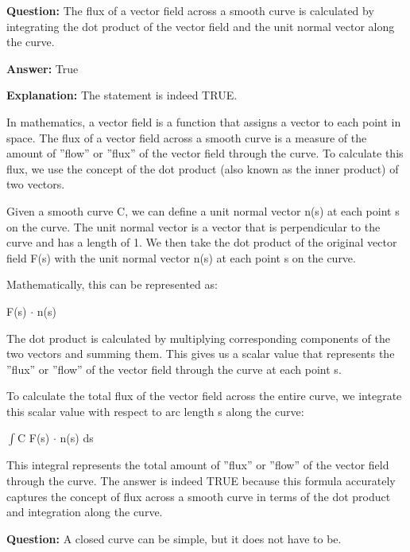 \documentclass{article}
\begin{document}
                \vspace{0.5cm} 
        
            
                \textbf {Question:} The flux of a vector field across a smooth curve is calculated by integrating the dot product of the vector field and the unit normal vector along the curve.
                
                \textbf{Answer:} True

                \textbf{Explanation:} The statement is indeed TRUE.

In mathematics, a vector field is a function that assigns a vector to each point in space. The flux of a vector field across a smooth curve is a measure of the amount of ''flow'' or ''flux'' of the vector field through the curve. To calculate this flux, we use the concept of the dot product (also known as the inner product) of two vectors.

Given a smooth curve C, we can define a unit normal vector n(s) at each point s on the curve. The unit normal vector is a vector that is perpendicular to the curve and has a length of 1. We then take the dot product of the original vector field F(s) with the unit normal vector n(s) at each point s on the curve.

Mathematically, this can be represented as:

F(s) \ensuremath{\cdot} n(s)

The dot product is calculated by multiplying corresponding components of the two vectors and summing them. This gives us a scalar value that represents the ''flux'' or ''flow'' of the vector field through the curve at each point s.

To calculate the total flux of the vector field across the entire curve, we integrate this scalar value with respect to arc length s along the curve:

\ensuremath{\int}C F(s) \ensuremath{\cdot} n(s) ds

This integral represents the total amount of ''flux'' or ''flow'' of the vector field through the curve. The answer is indeed TRUE because this formula accurately captures the concept of flux across a smooth curve in terms of the dot product and integration along the curve.
                
                \vspace{0.5cm} 
        
            
                \textbf {Question:} A closed curve can be simple, but it does not have to be.
                
\end{document}

